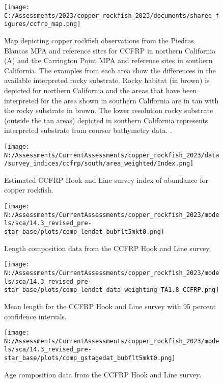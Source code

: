 \documentclass[11pt,
  english,
  letterpaper,
]{article}
\begin{document}
\pagebreak

\begin{figure}
\centering
\texttt{[image: C:/Assessments/2023/copper\_rockfish\_2023/documents/shared\_figures/ccfrp\_map.png]}
\caption{Map depicting copper rockfish observations from the Piedras Blancas MPA and reference sites for CCFRP in northern California (A) and the Carrington Point MPA and reference sites in southern California. The examples from each area show the differences in the available interpreted rocky substrate. Rocky habitat (in brown) is depicted for northern California and the areas that have been interpreted for the area shown in southern California are in tan with the rocky substrate in brown. The lower resolution rocky substrate (outside the tan areas) depicted in southern California represents interpreted substrate from courser bathymetry data. .\label{fig:ccfrp-map}}
\end{figure}

\begin{figure}
\centering
\texttt{[image: N:/Assessments/CurrentAssessments/copper\_rockfish\_2023/data/survey\_indices/ccfrp/south/area\_weighted/Index.png]}
\caption{Estimated CCFRP Hook and Line survey index of abundance for copper rockfish.\label{fig:ccfrp-index-main}}
\end{figure}

\pagebreak

\begin{figure}
\centering
\texttt{[image: N:/Assessments/CurrentAssessments/copper\_rockfish\_2023/models/sca/14.3\_revised\_pre-star\_base/plots/comp\_lendat\_bubflt5mkt0.png]}
\caption{Length composition data from the CCFRP Hook and Line survey.\label{fig:ccfrp-len-data}}
\end{figure}

\pagebreak

\begin{figure}
\centering
\texttt{[image: N:/Assessments/CurrentAssessments/copper\_rockfish\_2023/models/sca/14.3\_revised\_pre-star\_base/plots/comp\_lendat\_data\_weighting\_TA1.8\_CCFRP.png]}
\caption{Mean length for the CCFRP Hook and Line survey with 95 percent confidence intervals.\label{fig:ccfrp-mean-len-data}}
\end{figure}

\pagebreak

\begin{figure}
\centering
\texttt{[image: N:/Assessments/CurrentAssessments/copper\_rockfish\_2023/models/sca/14.3\_revised\_pre-star\_base/plots/comp\_gstagedat\_bubflt5mkt0.png]}
\caption{Age composition data from the CCFRP Hook and Line survey.\label{fig:ccfrp-age-data}}
\end{figure}
\end{document}
